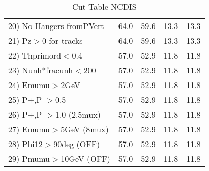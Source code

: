 \begin{table}[h!]
\begin{tabular}{||l||r|r|r|r||}
 20) No Hangers fromPVert &        64.0 &        59.6 &        13.3 &        13.3 \\
 21) Pz$>$0 for tracks    &        64.0 &        59.6 &        13.3 &        13.3 \\
 22) Thprimord$<$0.4      &        57.0 &        52.9 &        11.8 &        11.8 \\
 23) Nunh*fracunh$<$200   &        57.0 &        52.9 &        11.8 &        11.8 \\
 24) Emumu$>$2GeV         &        57.0 &        52.9 &        11.8 &        11.8 \\
 25) P+,P-$>$0.5          &        57.0 &        52.9 &        11.8 &        11.8 \\
 26) P+,P-$>$1.0 (2.5mux) &        57.0 &        52.9 &        11.8 &        11.8 \\
 27) Emumu$>$5GeV  (8mux) &        57.0 &        52.9 &        11.8 &        11.8 \\
 28) Phi12$>$90deg  (OFF) &        57.0 &        52.9 &        11.8 &        11.8 \\
 29) Pmumu$>$10GeV  (OFF) &        57.0 &        52.9 &        11.8 &        11.8 \\
 \hline
 \hline
 \end{tabular}
 \caption{Cut Table  NCDIS  }
 \label{tab-cut_ncdis}
 \end{table}
